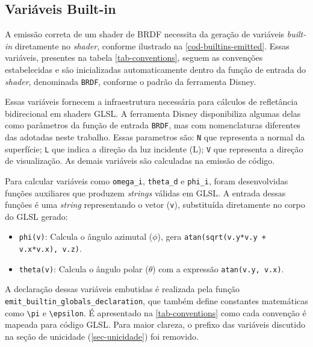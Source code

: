 \subsection{Variáveis Built-in}
A emissão correta de um shader de BRDF necessita da geração de variáveis \textit{built-in} diretamente no \textit{shader}, conforme ilustrado na \autoref{cod-builtins-emitted}. Essas variáveis, presentes na tabela \autoref{tab-conventions}, seguem as convenções estabelecidas e são inicializadas automaticamente dentro da função de entrada do \textit{shader}, denominada \verb|BRDF|, conforme o padrão da ferramenta Disney.

Essas variáveis fornecem a infraestrutura necessária para cálculos de refletância bidirecional em shaders GLSL. A ferramenta Disney disponibiliza algumas delas como parâmetros da função de entrada \verb`BRDF`, mas com nomenclaturas diferentes das adotadas neste trabalho. Essas parametros são: \verb"N" que representa a normal da superfície; \verb"L" que indica a direção da luz incidente (L); \verb"V" que representa a direção de visualização. As demais variáveis são calculadas na emissão de código.

Para calcular variáveis como \verb`omega_i`, \verb`theta_d` e \verb`phi_i`, foram desenvolvidas funções auxiliares que produzem \textit{strings} válidas em GLSL. A entrada dessas funções é uma \textit{string} representando o vetor (\verb`v`), substituída diretamente no corpo do GLSL gerado:
\begin{itemize}
    \item \verb`phi(v)`: Calcula o ângulo azimutal ($\phi$), gera \verb`atan(sqrt(v.y*v.y + v.x*v.x), v.z)`.
    \item \verb`theta(v)`: Calcula o ângulo polar ($\theta$) com a expressão \verb`atan(v.y, v.x)`.
\end{itemize}

A declaração dessas variáveis embutidas é realizada pela função \\ \verb`emit_builtin_globals_declaration`, que também define constantes matemáticas como \verb`\pi`  e \verb`\epsilon`. É apresentado na \autoref{tab-conventions} como cada convenção é mapeada para código GLSL. Para maior clareza, o prefixo das variáveis discutido na seção de unicidade (\autoref{sec-unicidade}) foi removido.

